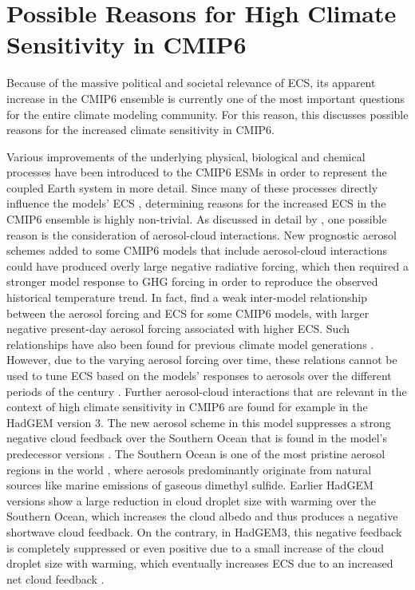 \section{Possible Reasons for High Climate Sensitivity in \acs{CMIP}6}
\label{sec:04:possible_reasons_high_ecs_cmip6}

Because of the massive political and societal relevance of \ac{ECS}, its
apparent increase in the \acs{CMIP}6 ensemble is currently one of the most
important questions for the entire climate modeling community. For this reason,
this  discusses possible
reasons for the increased climate sensitivity in \acs{CMIP}6.

Various improvements of the underlying physical, biological and chemical
processes have been introduced to the \acs{CMIP}6 \acp{ESM} in order to
represent the coupled Earth system in more detail. Since many of these
processes directly influence the models' \ac{ECS} \autocite{Forster2020},
determining reasons for the increased \ac{ECS} in the \acs{CMIP}6 ensemble is
highly non-trivial. As discussed in detail by \textcite{Meehl2020}, one
possible reason is the consideration of aerosol-cloud interactions. New
prognostic aerosol schemes added to some \acs{CMIP}6 models that include
aerosol-cloud interactions could have produced overly large negative radiative
forcing, which then required a stronger model response to \ac{GHG} forcing in
order to reproduce the observed historical temperature trend. In fact,
\textcite{Meehl2020} find a weak inter-model relationship between the aerosol
forcing and \ac{ECS} for some \acs{CMIP}6 models, with larger negative
present-day aerosol forcing associated with higher \ac{ECS}. Such relationships
have also been found for previous climate model generations
\autocite{Kiehl2007, Forster2013}. However, due to the varying aerosol forcing
over time, these relations cannot be used to tune \ac{ECS} based on the models'
responses to aerosols over the different periods of the  century
\autocite{Dittus2020}. Further aerosol-cloud interactions that are relevant in
the context of high climate sensitivity in \acs{CMIP}6 are found for example in
the \ac{HadGEM} version 3. The new aerosol scheme in this model suppresses a
strong negative cloud feedback over the Southern Ocean that is found in the
model's predecessor versions \autocite{BodasSalcedo2019}. The Southern Ocean is
one of the most pristine aerosol regions in the world \autocite{Hamilton2014},
where aerosols predominantly originate from natural sources like marine
emissions of gaseous dimethyl sulfide. Earlier \ac{HadGEM} versions show a
large reduction in cloud droplet size with warming over the Southern Ocean,
which increases the cloud albedo and thus produces a negative shortwave cloud
feedback. On the contrary, in \acs{HadGEM}3, this negative feedback is
completely suppressed or even positive due to a small increase of the cloud
droplet size with warming, which eventually increases \ac{ECS} due to an
increased net cloud feedback \autocite{BodasSalcedo2019}.


